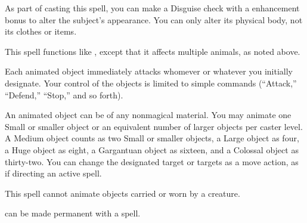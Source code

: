 \spelldur{\durlong}
\begin{spelleffect}
    As part of casting this spell, you can make a Disguise check with a  enhancement bonus to alter the subject's appearance. You can only alter its physical body, not its clothes or items.
\end{spelleffect}

\spellrng{\rngmed}
\begin{spelleffect}
  This spell functions like , except that it affects multiple animals, as noted above.
\end{spelleffect}

\spellrng{\rngmed}
\spelldur{\durshort}
\begin{spelleffect}
  Each animated object immediately attacks whomever or whatever you initially designate. Your control of the objects is limited to simple commands (``Attack,'' ``Defend,'' ``Stop,'' and so forth).
  \par An animated object can be of any nonmagical material. You may animate one Small or smaller object or an equivalent number of larger objects per caster level. A Medium object counts as two Small or smaller objects, a Large object as four, a Huge object as eight, a Gargantuan object as sixteen, and a Colossal object as thirty-two. You can change the designated target or targets as a move action, as if directing an active spell.
\end{spelleffect}
\begin{spellnotes}
  This spell cannot animate objects carried or worn by a creature.
  \par {} can be made permanent with a  spell.
\end{spellnotes}

